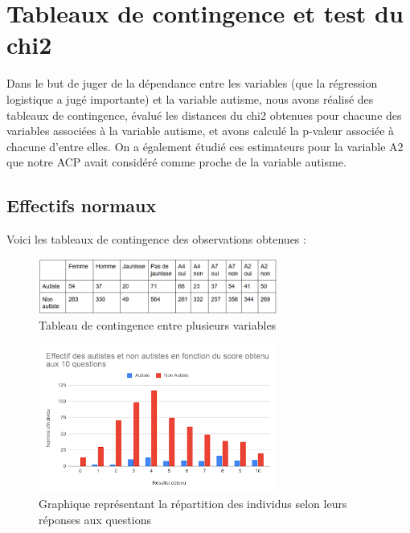 \documentclass[12,french]{report}
\begin{document}
\chapter{Tableaux de contingence et test du chi2}
Dans le but de juger de la dépendance entre les variables (que la régression logistique a jugé importante) et la variable autisme, nous avons réalisé des tableaux de contingence, évalué les distances du chi2 obtenues pour chacune des variables associées à la variable autisme, et avons calculé la p-valeur associée à chacune d’entre elles. On a également étudié ces estimateurs pour la variable A2 que notre ACP avait considéré comme proche de la variable autisme. \\

\section{Effectifs normaux}

Voici les tableaux de contingence des observations obtenues :\vspace{0.5cm}

\begin{figure}[H]
	\center
	\includegraphics[width=0.7\textwidth]{./Images/24}
	\caption{Tableau de contingence entre plusieurs variables}
\end{figure}\vspace{0.5cm}

\begin{figure}[H]
	\center
	\includegraphics[width=0.7\textwidth]{./Images/25}
	\caption{Graphique représentant la répartition des individus selon leurs réponses aux questions}
\end{figure}\vspace{0.5cm}
\end{document}
